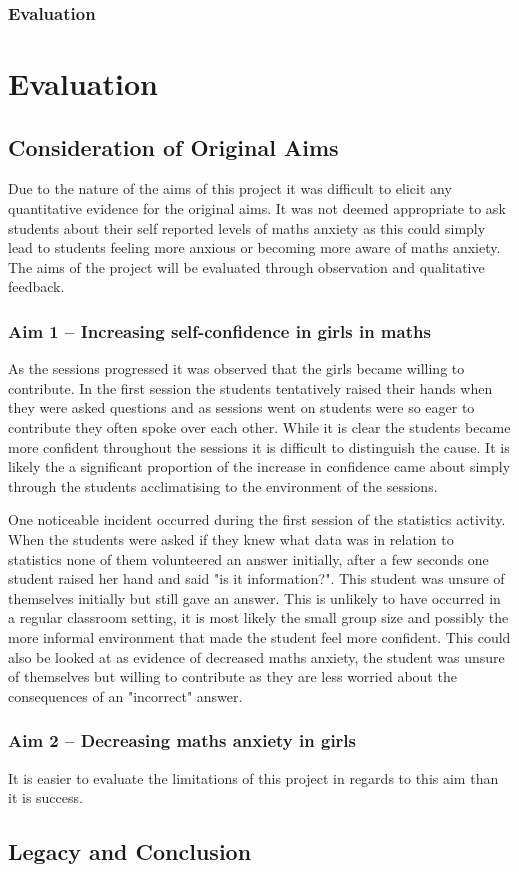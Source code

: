 \documentclass[11pt, a4paper, notitlepage]{article}
\begin{document}
\subsubsection*{Evaluation}

\section{Evaluation}

\subsection{Consideration of Original Aims}
Due to the nature of the aims of this project it was difficult to elicit any quantitative evidence for the original aims. It was not deemed appropriate to ask students about their self reported levels of maths anxiety as this could simply lead to students feeling more anxious or becoming more aware of maths anxiety. The aims of the project will be evaluated through observation and qualitative feedback.

\subsubsection*{Aim 1 -- Increasing self-confidence in girls in maths}
As the sessions progressed it was observed that the girls became willing to contribute. In the first session the students tentatively raised their hands when they were asked questions and as sessions went on students were so eager to contribute they often spoke over each other. While it is clear the students became more confident throughout the sessions it is difficult to distinguish the cause. It is likely the a significant proportion of the increase in confidence came about simply through the students acclimatising to the environment of the sessions.
\par
One noticeable incident occurred during the first session of the statistics activity. When the students were asked if they knew what data was in relation to statistics none of them volunteered an answer initially, after a few seconds one student raised her hand and said "is it information?". This student was unsure of themselves initially but still gave an answer. This is unlikely to have occurred in a regular classroom setting, it is most likely the small group size and possibly the more informal environment that made the student feel more confident. This could also be looked at as evidence of decreased maths anxiety, the student was unsure of themselves but willing to contribute as they are less worried about the consequences of an "incorrect" answer.


\subsubsection*{Aim 2 -- Decreasing maths anxiety in girls}
It is easier to evaluate the limitations of this project in regards to this aim than it is success. 

\subsection{Legacy and Conclusion}




\end{document}
